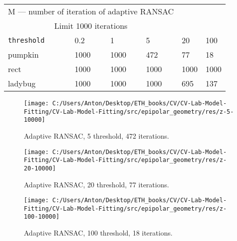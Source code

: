 \documentclass{report}
\begin{document}
\newpage
\begin{center}
	\begin{tabular}{|l|l|l|l|l|l|}
		\multicolumn{4}{c}{M --- number of iteration of adaptive RANSAC}\\
		\multicolumn{4}{c}{Limit 1000 iterations}\\
		
		\hline
		\texttt{threshold} &0.2 & 1 & 5 & 20 & 100 \\
		\hline
		pumpkin&1000&1000 & 472 &77 & 18 \\
		\hline 	
		rect & 1000&1000&1000&1000&1000\\
		\hline
		ladybug &1000&1000&1000&695&137\\
		\hline
		
	\end{tabular}
\end{center}
\begin{figure}[h!]
	\begin{center}
		\begin{minipage}[h]{0.9\linewidth}
			\texttt{[image: C:/Users/Anton/Desktop/ETH\_books/CV/CV-Lab-Model-Fitting/CV-Lab-Model-Fitting/src/epipolar\_geometry/res/z-5-10000]}
			\caption{Adaptive RANSAC, 5 threshold, 472 iterations.}
		\end{minipage}
	\end{center}
\end{figure}
\begin{figure}[h!]
	\begin{center}
		\begin{minipage}[h]{0.9\linewidth}
			\texttt{[image: C:/Users/Anton/Desktop/ETH\_books/CV/CV-Lab-Model-Fitting/CV-Lab-Model-Fitting/src/epipolar\_geometry/res/z-20-10000]}
			\caption{Adaptive RANSAC, 20 threshold, 77 iterations.}
		\end{minipage}
	\end{center}
\end{figure}
\begin{figure}[h!]
	\begin{center}
		\begin{minipage}[h]{0.9\linewidth}
			\texttt{[image: C:/Users/Anton/Desktop/ETH\_books/CV/CV-Lab-Model-Fitting/CV-Lab-Model-Fitting/src/epipolar\_geometry/res/z-100-10000]}
			\caption{Adaptive RANSAC, 100 threshold, 18 iterations.}
		\end{minipage}
	\end{center}
\end{figure}
\end{document}

